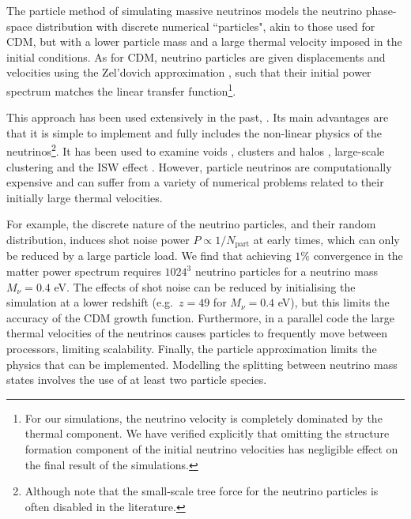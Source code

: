 \documentclass[useAMS, usenatbib]{mnras}
\begin{document}
The particle method of simulating massive neutrinos models the neutrino phase-space distribution with discrete numerical ``particles", akin to those used for CDM, but with a lower particle mass and a large thermal velocity imposed in the initial conditions. As for CDM, neutrino particles are given displacements and velocities using the Zel'dovich approximation \citep{Zeldovich_1970}, such that their initial power spectrum matches the linear transfer function\footnote{For our simulations, the neutrino velocity is completely dominated by the thermal component. We have verified explicitly that omitting the structure formation component of the initial neutrino velocities has negligible effect on the final result of the simulations.}.

This approach has been used extensively in the past, \cite[e.g.~][]{Brandbyge_2008, Bird_2012, Inman_2017, FVN_2017}. Its main advantages are that it is simple to implement and fully includes the non-linear physics of the neutrinos\footnote{Although note that the small-scale tree force for the neutrino particles is often disabled in the literature.}. It has been used to examine voids \citep{Massara_2015}, clusters and halos \citep{FVN_2014, Castorina_2014, Costanzi_2013}, large-scale clustering \citep{Castorina_2015} and the ISW effect \citep{Carbone_2016}. However, particle neutrinos are computationally expensive and can suffer from a variety of numerical problems related to their initially large thermal velocities.

For example, the discrete nature of the neutrino particles, and their random distribution, induces shot noise power $P \propto 1/N_\mathrm{part}$ at early times, which can only be reduced by a large particle load. We find that achieving $1\%$ convergence in the matter power spectrum requires $1024^3$ neutrino particles for a neutrino mass $M_\nu = 0.4$ eV. The effects of shot noise can be reduced by initialising the simulation at a lower redshift (e.g.~$z=49$ for $M_\nu = 0.4$ eV), but this limits the accuracy of the CDM growth function. Furthermore, in a parallel code the large thermal velocities of the neutrinos causes particles to frequently move between processors, limiting scalability. Finally, the particle approximation limits the physics that can be implemented. Modelling the splitting between neutrino mass states involves the use of at least two particle species.
\end{document}
